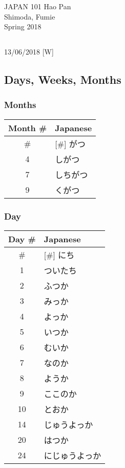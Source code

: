 \documentclass{article}
\begin{document}
 \begin{CJK}{UTF8}{min}

\noindent
{JAPAN 101 \hfill Hao Pan}\\
{Shimoda, Fumie}\\
{Spring 2018}


\begin{center}
\section{}
\noindent
{\hfill 13/06/2018 [W]}
\end{center}

\subsection{Days, Weeks, Months}

\begin{multicols}{3}

\subsubsection{Months}
\begin{tabular}{ | c | l | }
\hline
Month \# & Japanese\\
\hline
\# & [\#] がつ\\
4 & しがつ\\
7 & しちがつ\\
9 & くがつ\\
\hline
\end{tabular}

\vfill\null
\columnbreak

\subsubsection{Day}
\begin{tabular}{ | c | l | }
\hline
Day \# & Japanese\\
\hline
\# & [\#] にち\\
1 & ついたち\\
2 & ふつか\\
3 & みっか\\
4 & よっか\\
5 & いつか\\
6 & むいか\\
7 & なのか\\
8 & ようか\\
9 & ここのか\\
10 & とおか\\
14 & じゅうよっか\\
20 & はつか\\
24 & にじゅうよっか\\
\hline
\end{tabular}


\end{multicols}
\end{CJK}
\end{document}
